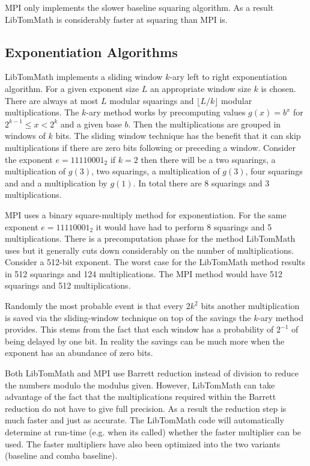 \documentclass{article}
\begin{document}
MPI only implements the slower baseline squaring algorithm.  As a result LibTomMath is considerably faster at squaring
than MPI is.

\subsection{Exponentiation Algorithms}

LibTomMath implements a sliding window $k$-ary left to right exponentiation algorithm.  For a given exponent size $L$ an
appropriate window size $k$ is chosen.  There are always at most $L$ modular squarings and $\lfloor L/k \rfloor$ modular
multiplications.   The $k$-ary method works by precomputing values $g(x) = b^x$ for $2^{k-1} \le x < 2^k$ and a given base 
$b$.  Then the multiplications are grouped in windows of $k$ bits.  The sliding window technique has the benefit 
that it can skip multiplications if there are zero bits following or preceding a window.  Consider the exponent 
$e = 11110001_2$ if $k = 2$ then there will be a two squarings, a multiplication of $g(3)$, two squarings, a multiplication
of $g(3)$, four squarings and and a multiplication by $g(1)$.  In total there are 8 squarings and 3 multiplications.

MPI uses a binary square-multiply method for exponentiation.  For the same exponent $e = 11110001_2$ it would have had to
perform 8 squarings and 5 multiplications.  There is a precomputation phase for the method LibTomMath uses but it 
generally cuts down considerably on the number of multiplications.  Consider a 512-bit exponent.  The worst case for the 
LibTomMath method results in 512 squarings and 124 multiplications.  The MPI method would have 512 squarings 
and 512 multiplications.  

Randomly the most probable event is that every $2k^2$ bits another multiplication is saved via the 
sliding-window technique on top of the savings the $k$-ary method provides.  This stems from the fact that each window
has a probability of $2^{-1}$ of being delayed by one bit.  In reality the savings can be much more when the exponent
has an abundance of zero bits.  

Both LibTomMath and MPI use Barrett reduction instead of division to reduce the numbers modulo the modulus given.
However, LibTomMath can take advantage of the fact that the multiplications required within the Barrett reduction
do not have to give full precision.  As a result the reduction step is much faster and just as accurate.  The LibTomMath 
code will automatically determine at run-time (e.g. when its called) whether the faster multiplier can be used.  The
faster multipliers have also been optimized into the two variants (baseline and comba baseline).
\end{document}
